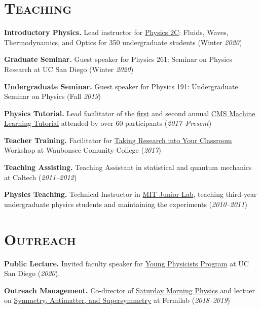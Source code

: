\documentclass[12pt]{res}
\newcommand{\MarginText}[1]{\section{\textsc{#1}}\vspace{10pt}}
\begin{document}
\begin{resume}

\MarginText{Teaching}

\textbf{Introductory Physics.} Lead instructor for
\href{https://jduarte.physics.ucsd.edu/phys2c/index.html}{Physics 2C}:
Fluids, Waves, Thermodynamics, and Optics for 350 undergraduate students
(Winter \textit{2020})

\textbf{Graduate Seminar.} Guest speaker for Physics 261:
Seminar on Physics Research at UC San Diego (Winter \textit{2020})

\textbf{Undergraduate Seminar.} Guest speaker for Physics 191:
Undergraduate Seminar on Physics (Fall \textit{2019})

\textbf{Physics Tutorial.} Lead facilitator of the
\href{https://indico.cern.ch/event/628146/}{first} and second annual \href{https://indico.cern.ch/event/726984/}{CMS Machine Learning
    Tutorial} attended by over 60 participants (\textit{2017--Present})

\textbf{Teacher Training.} Facilitator for
  \href{http://eddata.fnal.gov/lasso/program_search/show_workshopID_new.lasso?event_id=435}{Taking  Research into Your Classroom} Workshop at Waubonsee Comunity College (\textit{2017})

\textbf{Teaching Assisting.} Teaching Assistant in statistical and quantum mechanics at Caltech (\textit{2011--2012})

\textbf{Physics Teaching.} Technical Instructor in \href{http://web.mit.edu/8.13/www/index.shtml}{MIT Junior Lab}, teaching third-year
  undergraduate physics students and maintaining the experiments (\textit{2010--2011})



  \MarginText{Outreach}

\textbf{Public Lecture.} Invited faculty speaker for \href{http://ypp.ucsd.edu/}{Young Physicists Program} at UC
San Diego (\textit{2020}).

\textbf{Outreach Management.} Co-director of \href{http://saturdaymorningphysics.fnal.gov/}{Saturday
  Morning Physics} and lectuer on \href{http://saturdaymorningphysics.fnal.gov/fall-session-2018/}{Symmetry, Antimatter, and Supersymmetry} at Fermilab (\textit{2018--2019})


\end{resume}
\end{document}
